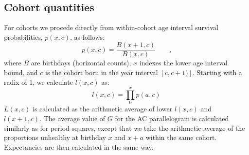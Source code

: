 \documentclass[11pt,oneside,a4paper]{article} %
\newcommand{\tc}{\quad\quad\text{,}}
\begin{document}
\subsection{Cohort quantities}
For cohorts we procede directly from within-cohort age interval survival
probabilities, $p(x,c)$, as follows:
\begin{equation}
p(x,c) = \frac{B(x+1,c)}{B(x,c)} \tc
\end{equation}
where $B$ are birthdays (horizontal counts), $x$ indexes the lower age interval
bound, and $c$ is the cohort born in the year interval $[c,c+1)]$. Starting with
a radix of 1, we calculate $l(x,c)$ as:
\begin{equation}
l(x,c) = \prod_0^x p(a,c)
\end{equation}
$L(x,c)$ is calculated as the arithmetic average of lower $l(x,c)$ and
$l(x+1,c)$. The average value of $G$ for the AC parallelogram is calculated
similarly as for period squares, except that we take the arithmetic average of
the proportions unhealthy at birthday $x$ and $x+a$ within the same cohort.
Expectancies are then calculated in the same way.
\end{document}
